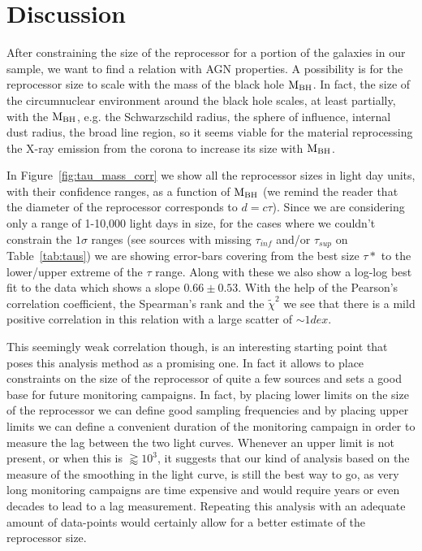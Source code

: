 \section{Discussion}
After constraining the size of the reprocessor for a portion of the galaxies in our sample, we want to find a relation with AGN properties. 
A possibility is for the reprocessor size to scale with the mass of the black hole ${\rm M}_{\rm BH}$. In fact, the size of the circumnuclear environment around the black hole scales, at least partially, with the ${\rm M}_{\rm BH}$, e.g. the Schwarzschild radius, the sphere of influence, internal dust radius, the broad line region, so it seems viable for the material reprocessing the X-ray emission from the corona to increase its size with ${\rm M}_{\rm BH}$.

In Figure~\ref{fig:tau_mass_corr} we show all the reprocessor sizes in light day units, with their confidence ranges, as a function of ${\rm M}_{\rm BH}$ (we remind the reader that the diameter of the reprocessor corresponds to $d=c\tau$). Since we are considering only a range of 1-10,000 light days in size, for the cases where we couldn't constrain the $1\sigma$ ranges (see sources with missing $\tau_{inf}$ and/or $\tau_{sup}$ on Table~\ref{tab:taus}) we are showing error-bars covering from the best size $\tau*$ to the lower/upper extreme of the $\tau$ range. Along with these we also show a log-log best fit to the data which shows a slope $0.66\pm0.53$. With the help of the Pearson's correlation coefficient, the Spearman's rank and the $\tilde\chi^2$ we see that there is a mild positive correlation in this relation with a large scatter of $\sim1 dex$.

This seemingly weak correlation though, is an interesting starting point that poses this analysis method as a promising one. In fact it allows to place constraints on the size of the reprocessor of quite a few sources and sets a good base for future monitoring campaigns. In fact, by placing lower limits on the size of the reprocessor we can define good sampling frequencies and by placing upper limits we can define a convenient duration of the monitoring campaign in order to measure the lag between the two light curves. 
Whenever an upper limit is not present, or when this is $\gtrapprox10^3$, it suggests that our kind of analysis based on the measure of the smoothing in the \kalfa{} light curve, is still the best way to go, as very long monitoring campaigns are time expensive and would require years or even decades to lead to a lag measurement. Repeating this analysis with an adequate amount of data-points would certainly allow for a better estimate of the reprocessor size.

